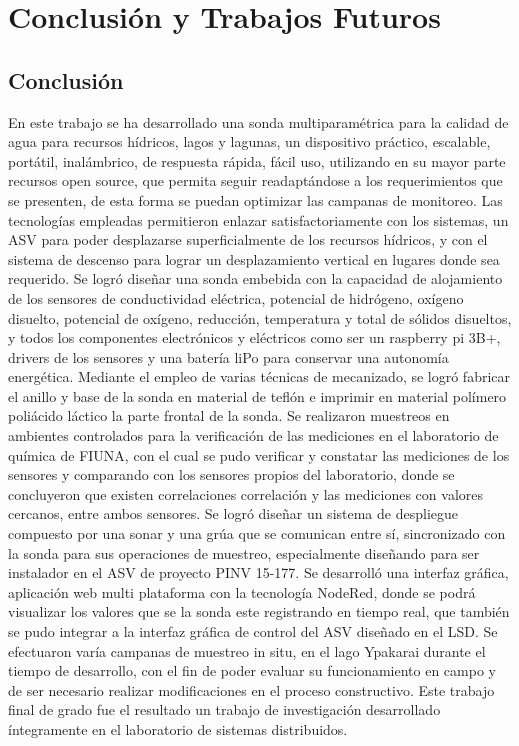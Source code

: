 \chapter[Conclusi\'on y Trabajos Futuros]{ Conclusión y Trabajos Futuros}
\pagestyle{fancy}

\section{Conclusi\'on}
En este trabajo se ha desarrollado una sonda multiparam\'etrica para la calidad de agua para recursos hídricos, lagos y lagunas, un dispositivo pr\'actico, escalable, port\'atil, inal\'ambrico, de respuesta r\'apida,  fácil uso, utilizando en su mayor parte recursos open source, que permita seguir readapt\'andose a los requerimientos que se presenten, de esta forma se puedan optimizar las campanas de monitoreo. 
Las tecnolog\'ias empleadas permitieron enlazar satisfactoriamente con los sistemas, un ASV para poder desplazarse superficialmente de los recursos h\'idricos, y con el sistema de descenso para lograr un desplazamiento vertical en lugares donde sea requerido. 
Se logr\'o dise\~nar una sonda embebida con la capacidad de alojamiento de los sensores de conductividad el\'ectrica, potencial de hidr\'ogeno, ox\'igeno disuelto, potencial de ox\'igeno, reducci\'on, temperatura  y total de s\'olidos disueltos, y todos los componentes electr\'onicos y el\'ectricos como ser un raspberry pi 3B+, drivers de los sensores y una bater\'ia liPo para conservar una autonom\'ia energ\'etica.
Mediante el empleo de varias t\'ecnicas de mecanizado, se logr\'o fabricar el anillo y base de la sonda en material de tefl\'on e imprimir en material pol\'imero poli\'acido l\'actico la parte frontal de la sonda.
Se realizaron muestreos en ambientes controlados para la verificaci\'on de las mediciones en el laboratorio de qu\'imica de FIUNA, con el cual se pudo verificar y constatar las mediciones de los sensores y comparando con los sensores propios del laboratorio, donde se concluyeron que existen correlaciones correlaci\'on y las mediciones con valores cercanos, entre ambos sensores.
Se logr\'o dise\~nar un sistema de despliegue compuesto por una sonar y una gr\'ua que se comunican entre s\'i, sincronizado con la sonda para sus operaciones de muestreo, especialmente dise\~nando para ser instalador en el ASV de proyecto PINV 15-177. 
Se desarroll\'o una interfaz gr\'afica, aplicaci\'on web multi plataforma con la tecnología NodeRed, donde se podrá visualizar los valores que se la sonda este registrando en tiempo real, que también se pudo integrar a la interfaz gráfica de control del ASV diseñado en el LSD.
Se efectuaron varía campanas de muestreo in situ, en el lago Ypakarai durante el tiempo de desarrollo, con el fin de poder evaluar su funcionamiento en campo y de ser necesario realizar modificaciones en el proceso constructivo.
Este trabajo final de grado fue el resultado un trabajo de investigación desarrollado íntegramente en el laboratorio de sistemas distribuidos. 
